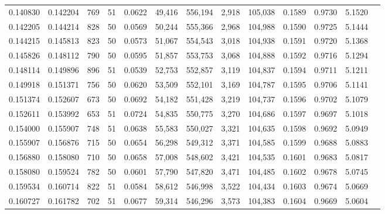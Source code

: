\begin{tabular}{rrrrrrrrrrrrr}
0.140830 & 0.142204 &   769 &  51 &                                     0.0622 &  49,416 & 556,194 &   2,918 & 105,038 & 0.1589 & 0.9730 & 5.1520 \\
0.142205 & 0.144214 &   828 &  50 &                                     0.0569 &  50,244 & 555,366 &   2,968 & 104,988 & 0.1590 & 0.9725 & 5.1444 \\
0.144215 & 0.145813 &   823 &  50 &                                     0.0573 &  51,067 & 554,543 &   3,018 & 104,938 & 0.1591 & 0.9720 & 5.1368 \\
0.145826 & 0.148112 &   790 &  50 &                                     0.0595 &  51,857 & 553,753 &   3,068 & 104,888 & 0.1592 & 0.9716 & 5.1294 \\
0.148114 & 0.149896 &   896 &  51 &                                     0.0539 &  52,753 & 552,857 &   3,119 & 104,837 & 0.1594 & 0.9711 & 5.1211 \\
0.149918 & 0.151371 &   756 &  50 &                                     0.0620 &  53,509 & 552,101 &   3,169 & 104,787 & 0.1595 & 0.9706 & 5.1141 \\
0.151374 & 0.152607 &   673 &  50 &                                     0.0692 &  54,182 & 551,428 &   3,219 & 104,737 & 0.1596 & 0.9702 & 5.1079 \\
0.152611 & 0.153992 &   653 &  51 &                                     0.0724 &  54,835 & 550,775 &   3,270 & 104,686 & 0.1597 & 0.9697 & 5.1018 \\
0.154000 & 0.155907 &   748 &  51 &                                     0.0638 &  55,583 & 550,027 &   3,321 & 104,635 & 0.1598 & 0.9692 & 5.0949 \\
0.155907 & 0.156876 &   715 &  50 &                                     0.0654 &  56,298 & 549,312 &   3,371 & 104,585 & 0.1599 & 0.9688 & 5.0883 \\
0.156880 & 0.158080 &   710 &  50 &                                     0.0658 &  57,008 & 548,602 &   3,421 & 104,535 & 0.1601 & 0.9683 & 5.0817 \\
0.158080 & 0.159524 &   782 &  50 &                                     0.0601 &  57,790 & 547,820 &   3,471 & 104,485 & 0.1602 & 0.9678 & 5.0745 \\
0.159534 & 0.160714 &   822 &  51 &                                     0.0584 &  58,612 & 546,998 &   3,522 & 104,434 & 0.1603 & 0.9674 & 5.0669 \\
0.160727 & 0.161782 &   702 &  51 &                                     0.0677 &  59,314 & 546,296 &   3,573 & 104,383 & 0.1604 & 0.9669 & 5.0604 \\

\end{tabular}
